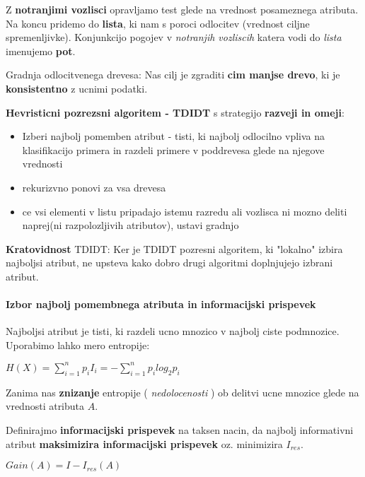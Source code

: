 \documentclass{article}
\begin{document}
\begin{multicols}{2}
	Z \textbf{notranjimi vozlisci} opravljamo test glede na vrednost posameznega atributa. Na koncu pridemo do \textbf{lista}, ki nam
	s poroci odlocitev (vrednost ciljne spremenljivke). Konjunkcijo pogojev v \textit{notranjih vozliscih} katera vodi do \textit{lista}
	imenujemo \textbf{pot}.

	Gradnja odlocitvenega drevesa:
	Nas cilj je zgraditi \textbf{cim manjse drevo}, ki je \textbf{konsistentno} z ucnimi podatki.

	\textbf{Hevristicni pozrezsni algoritem - TDIDT} s strategijo \textbf{razveji in omeji}:
	\begin{itemize}
		\item Izberi najbolj pomemben atribut - tisti, ki najbolj odlocilno vpliva na klasifikacijo primera in razdeli
		      primere v poddrevesa glede na njegove vrednosti
		\item  rekurizvno ponovi za vsa drevesa
		\item ce vsi elementi v listu pripadajo istemu razredu ali vozlisca ni mozno deliti naprej(ni razpolozljivih atributov), ustavi gradnjo
	\end{itemize}

	\textbf{Kratovidnost} TDIDT:
	Ker je TDIDT pozresni algoritem, ki "lokalno" izbira najboljsi atribut, ne upsteva kako dobro drugi algoritmi
	doplnjujejo izbrani atribut.


	\paragraph{Izbor najbolj pomembnega atributa in informacijski prispevek}
	Najboljsi atribut je tisti, ki razdeli ucno mnozico v najbolj ciste podmnozice.
	Uporabimo lahko mero entropije:
	\begin{center}
		\begin{math}
			H(X) = \sum_{i=1}^{n} p_i I_i = -\sum_{i=1}^{n} p_i log_2 p_i
		\end{math}
	\end{center}

	Zanima nas \textbf{znizanje} entropije ( \textit{nedolocenosti} ) ob delitvi ucne mnozice glede
	na vrednosti atributa $A$.

	Definirajmo \textbf{informacijski prispevek} na taksen nacin,
	da najbolj informativni atribut \textbf{maksimizira informacijski prispevek} oz. minimizira $I_{res}$.
	\begin{center}
		\begin{math}
			Gain(A) = I - I_{res}(A)
		\end{math}


\end{center}
\end{multicols}
\end{document}
